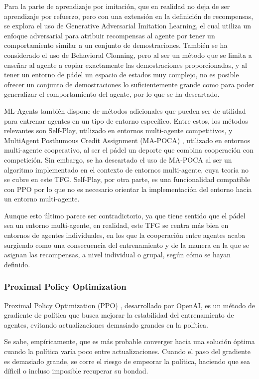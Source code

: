 Para la parte de aprendizaje por imitación, que en realidad no deja de ser aprendizaje por refuerzo, pero con una extensión en la definición de recompensas, se explora el uso de Generative Adversarial Imitation Learning, el cual utiliza un enfoque adversarial para atribuir recompensas al agente por tener un comportamiento similar a un conjunto de demostraciones. También se ha considerado el uso de Behavioral Clonning, pero al ser un método que se limita a enseñar al agente a copiar exactamente las demostraciones proporcionadas, y al tener un entorno de pádel un espacio de estados muy complejo, no es posible ofrecer un conjunto de demostraciones lo suficientemente grande como para poder generalizar el comportamiento del agente, por lo que se ha descartado.

ML-Agents también dispone de métodos adicionales que pueden ser de utilidad para entrenar agentes en un tipo de entorno específico. Entre estos, los métodos relevantes son Self-Play, utilizado en entornos multi-agente competitivos, y MultiAgent Posthumous Credit Assignment (MA-POCA) \cite{cohen2022use}, utilizado en entornos multi-agente cooperativo, al ser el pádel un deporte que combina cooperación con competición. Sin embargo, se ha descartado el uso de MA-POCA al ser un algoritmo implementado en el contexto de entornos multi-agente, cuya teoría no se cubre en este TFG. Self-Play, por otra parte, es una funcionalidad compatible con PPO por lo que no es necesario orientar la implementación del entorno hacia un entorno multi-agente.

Aunque esto último parece ser contradictorio, ya que tiene sentido que el pádel sea un entorno multi-agente, en realidad, este TFG se centra más bien en entornos de agentes individuales, en los que la cooperación entre agentes acaba surgiendo como una consecuencia del entrenamiento y de la manera en la que se asignan las recompensas, a nivel individual o grupal, según cómo se hayan definido.

\subsubsection{Proximal Policy Optimization}

Proximal Policy Optimization (PPO) \cite{schulman2017proximal}, desarrollado por OpenAI, es un método de gradiente de política que busca mejorar la estabilidad del entrenamiento de agentes, evitando actualizaciones demasiado grandes en la política.

Se sabe, empíricamente, que es más probable converger hacia una solución óptima cuando la política varía poco entre actualizaciones. Cuando el paso del gradiente es demasiado grande, se corre el riesgo de empeorar la política, haciendo que sea díficil o incluso imposible recuperar su bondad.

